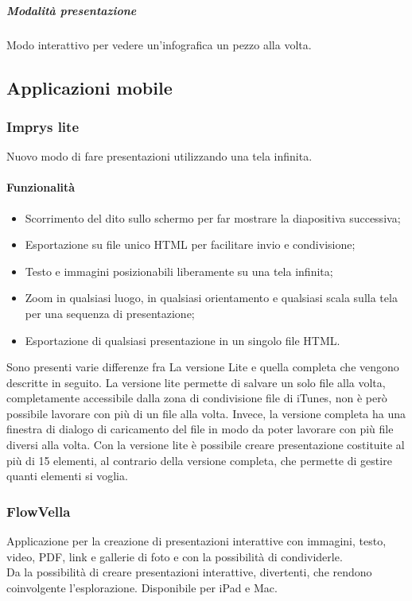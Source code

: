 \subparagraph{Modalità presentazione}
Modo interattivo per vedere un'infografica un pezzo alla volta.
\subsection{Applicazioni mobile}
\subsubsection{Imprys lite}
Nuovo modo di fare presentazioni utilizzando una tela infinita.
\paragraph{Funzionalità}
\begin{itemize}
\item Scorrimento del dito sullo schermo per far mostrare la diapositiva successiva;
\item Esportazione su file unico HTML per facilitare invio e condivisione;
\item Testo e immagini posizionabili liberamente su una tela infinita;
\item Zoom in qualsiasi luogo, in qualsiasi orientamento e qualsiasi scala sulla tela per una sequenza di presentazione;
\item Esportazione di qualsiasi presentazione in un singolo file HTML.
\end{itemize}
Sono presenti varie differenze fra La versione Lite e quella completa che vengono descritte in seguito.
La versione lite permette di salvare un solo file alla volta, completamente accessibile dalla zona di condivisione file di iTunes, non è però possibile lavorare con più di un file alla volta. 
Invece, la versione completa ha una finestra di dialogo di caricamento del file in modo da poter lavorare con più file diversi alla volta.
Con la versione lite è possibile creare presentazione costituite al più di 15 elementi, al contrario della versione completa, che permette di gestire quanti elementi si voglia.

\subsubsection{FlowVella}
Applicazione per la creazione di presentazioni interattive con immagini, testo, video, PDF, link e gallerie di foto e con la possibilità di condividerle.\\
Da la possibilità di creare presentazioni interattive, divertenti, che rendono coinvolgente l'esplorazione.
Disponibile per iPad e Mac.
